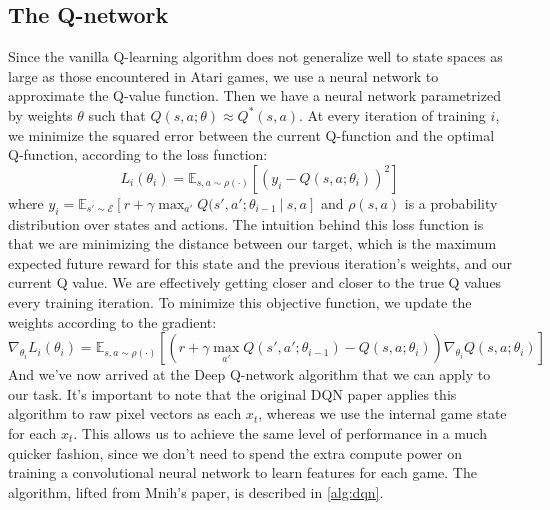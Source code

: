 \documentclass{article}
\begin{document}
\subsection{The Q-network}
Since the vanilla Q-learning algorithm does not generalize well to state spaces as large as those encountered in Atari games, we use a neural network to approximate the Q-value function. 
Then we have a neural network parametrized by weights $\theta$ such that $Q(s, a; \theta) \approx Q^{*}(s, a)$.
At every iteration of training $i$, we minimize the squared error between the current Q-function and the optimal Q-function, according to the loss function:
\begin{equation}
\displaystyle L_i(\theta_i) = \mathbb{E}_{s, a \sim \rho(\cdot)}[(y_i - Q(s, a; \theta_i))^2]
\end{equation}
where $y_i = \mathbb{E}_{s' \sim \mathcal{E}}[r + \gamma\max_{a'}Q(s', a'; \theta_{i - 1}\ |\ s, a]$ and $\rho(s, a)$ is a probability distribution over states and actions. 
The intuition behind this loss function is that we are minimizing the distance between our target, which is the maximum expected future reward for this state and the previous iteration's weights, and our current Q value.
We are effectively getting closer and closer to the true Q values every training iteration.
To minimize this objective function, we update the weights according to the gradient:
\begin{equation}
\displaystyle \nabla_{\theta_i}L_i(\theta_i) = \mathbb{E}_{s, a \sim \rho(\cdot)}[(r + \gamma \max_{a'}Q(s', a'; \theta_{i - 1}) - Q(s, a; \theta_i))\nabla_{\theta_i}Q(s, a; \theta_i)]
\label{eq:gd}
\end{equation}
And we've now arrived at the Deep Q-network algorithm that we can apply to our task.
It's important to note that the original DQN paper applies this algorithm to raw pixel vectors as each $x_t$, whereas we use the internal game state for each $x_t$.
This allows us to achieve the same level of performance in a much quicker fashion, since we don't need to spend the extra compute power on training a convolutional neural network to learn features for each game.
The algorithm, lifted from Mnih's paper, is described in \ref{alg:dqn}.
\end{document}

